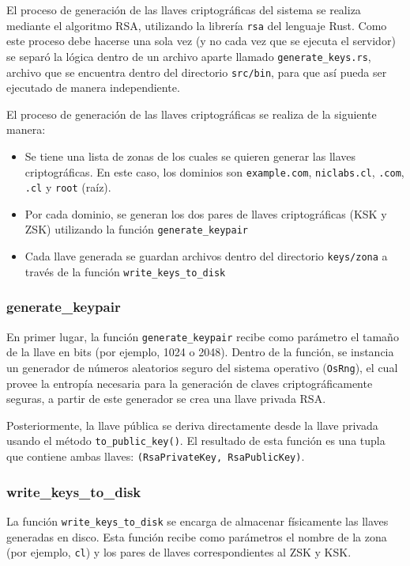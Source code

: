 El proceso de generación de las llaves criptográficas del sistema se realiza mediante el algoritmo RSA, utilizando la librería \texttt{rsa} del lenguaje Rust. Como 
este proceso debe hacerse una sola vez (y no cada vez que se ejecuta el servidor) se separó la lógica dentro de un archivo aparte llamado \texttt{generate\_keys.rs}, archivo
que se encuentra dentro del directorio \texttt{src/bin}, para que así pueda ser ejecutado de manera independiente.

El proceso de generación de las llaves criptográficas se realiza de la siguiente manera:
\begin{itemize}
    \item Se tiene una lista de zonas de los cuales se quieren generar las llaves criptográficas. En este caso, los dominios son \texttt{example.com},
          \texttt{niclabs.cl}, \texttt{.com}, \texttt{.cl} y \texttt{root} (raíz).
    \item Por cada dominio, se generan los dos pares de llaves criptográficas (KSK y ZSK) utilizando la función \texttt{generate\_keypair}
    \item Cada llave generada se guardan archivos dentro del directorio \texttt{keys/zona} a través de la función \texttt{write\_keys\_to\_disk}
\end{itemize}

\subsubsection{generate\_keypair}

En primer lugar, la función \texttt{generate\_keypair} recibe como parámetro el tamaño de la llave en bits (por ejemplo, 1024 o 2048). Dentro de la función, 
se instancia un generador de números aleatorios seguro del sistema operativo (\texttt{OsRng}), el cual provee la entropía necesaria para la generación de claves criptográficamente seguras, a 
partir de este generador se crea una llave privada RSA.

Posteriormente, la llave pública se deriva directamente desde la llave privada usando el método \texttt{to\_public\_key()}.
El resultado de esta función es una tupla que contiene ambas llaves: \texttt{(RsaPrivateKey, RsaPublicKey)}.

\subsubsection{write\_keys\_to\_disk}

La función \texttt{write\_keys\_to\_disk} se encarga de almacenar físicamente las llaves generadas en disco.
Esta función recibe como parámetros el nombre de la zona (por ejemplo, \texttt{cl}) y los pares de llaves correspondientes al ZSK y KSK.

